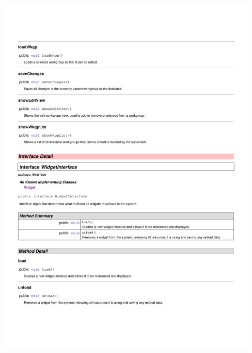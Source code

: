 \documentclass[letterpaper,12pt]{report}
\begin{document}
\includegraphics[scale=0.9,trim=20mm 30mm 25mm 25mm]{externals/InterfaceDataDictionary12.pdf}
\newpage
\end{document}
